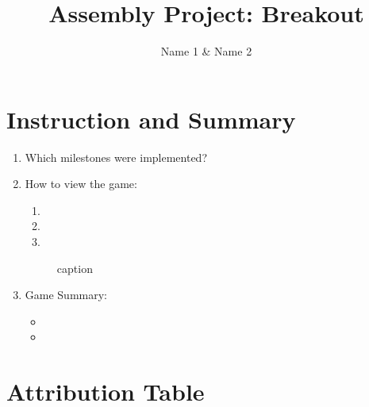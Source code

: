 \documentclass{article}
\title{Assembly Project: Breakout}
\author{Name 1 & Name 2}
\begin{document}
\maketitle

\section{Instruction and Summary}

\begin{enumerate}

    \item Which milestones were implemented? 

    \item How to view the game:
    
    \begin{enumerate}

    \item
    \item
    \item


    \end{enumerate}

    

\begin{figure}[ht!]
    \centering
    \caption{caption}
    \label{Instructions}
\end{figure}

\item Game Summary:
\begin{itemize}
\item
\item
\end{itemize}

    
\end{enumerate}

\section{Attribution Table}
\end{document}
